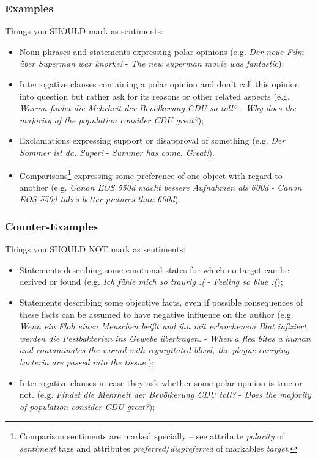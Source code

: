 \documentclass[11pt,a4paper]{article}
\begin{document}
\subsubsection{Examples}
Things you SHOULD mark as sentiments:
\begin{itemize}
  \item Noun phrases and statements expressing polar opinions
    (e.g. \textit{Der neue Film \"uber Superman war knorke!} -
    \textit{The new superman movie was fantastic});
  \item Interrogative clauses containing a polar opinion
    and don't call this opinion into question but rather ask for its
    reasons or other related aspects (e.g. \textit{Warum findet die
      Mehrheit der Bev\"olkerung CDU so toll?} - \textit{Why does the
      majority of the population consider CDU great?});
  \item Exclamations expressing support or disapproval of
    something (e.g. \textit{Der Sommer ist da. Super!} -
    \textit{Summer has come. Great!}).
  \item Comparisons\footnote{Comparison sentiments are marked
    specially -- see attribute \textit{polarity} of \textit{sentiment}
    tags and attributes \textit{preferred}/\textit{dispreferred} of
    markables \textit{target}.} expressing some preference
    of one object with regard to another (e.g. \textit{Canon EOS 550d
      macht bessere Aufnahmen als 600d} - \textit{Canon EOS 550d takes
      better pictures than 600d}).

\end{itemize}

\subsubsection{Counter-Examples}
Things you SHOULD NOT mark as sentiments:
\begin{itemize}
  \item Statements describing some emotional states for which no
    target can be derived or found (e.g. \textit{Ich f\"uhle mich so
      traurig :(} - \textit{Feeling so blue :(});
  \item Statements describing some objective facts, even if possible
    consequences of these facts can be assumed to have negative
    influence on the author (e.g. \textit{Wenn ein Floh einen Menschen
      bei\ss{}t und ihn mit erbrochenem Blut infiziert, werden die
      Pestbakterien ins Gewebe \"ubertragen.} - \textit{When a flea
      bites a human and contaminates the wound with regurgitated
      blood, the plague carrying bacteria are passed into the
      tissue.});
  \item Interrogative clauses in case they ask whether some polar
    opinion is true or not. (e.g. \textit{Findet die Mehrheit
      der Bev\"olkerung CDU toll?} - \textit{Does the majority
      of population consider CDU great?});
\end{itemize}
\end{document}
